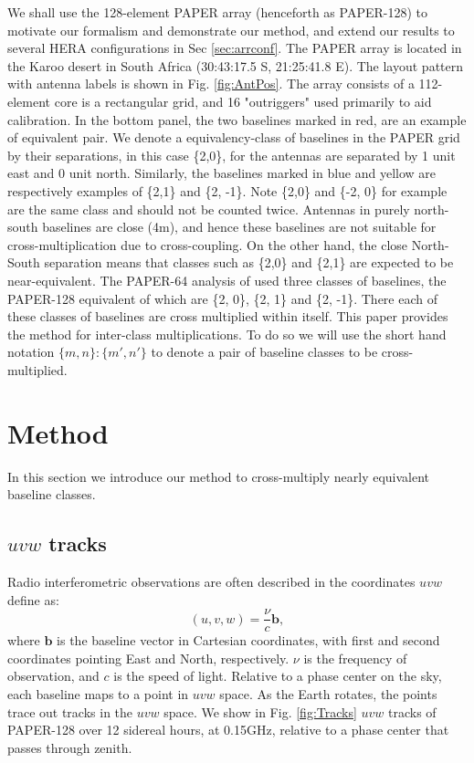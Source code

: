 \documentclass[twocolumn,apj,numberedappendix]{emulateapj}
\renewcommand\[{\begin{equation}}
\renewcommand\]{\end{equation}}
\begin{document}
We shall use the 128-element PAPER array (henceforth as PAPER-128) to motivate our formalism and demonstrate our method, and extend our results to several HERA configurations in Sec \ref{sec:arrconf}. 
The PAPER array is located in the Karoo desert in South Africa (30:43:17.5
S, 21:25:41.8 E). The layout pattern with antenna labels is shown
in Fig. \ref{fig:AntPos}. The array consists of a 112-element core is a rectangular grid, and 16 "outriggers" used primarily to aid calibration.  In the bottom panel, the two baselines marked in red, are an example of equivalent pair. We denote a equivalency-class of baselines in the PAPER grid by their separations, in this case  \{2,0\}, for the
antennas are separated by 1 unit east and 0 unit north. Similarly,
the baselines marked in blue and yellow are respectively examples
of \{2,1\} and \{2, -1\}.
Note \{2,0\} and \{-2, 0\} for example are the same class and should
not be counted twice. Antennas in purely north-south baselines
are close (4m), and hence these baselines are not suitable
for cross-multiplication due to cross-coupling. On the other hand, the close North-South separation means that classes such as \{2,0\} and  \{2,1\} are expected to be near-equivalent. The PAPER-64 analysis of \cite{Ali2015} used three classes of baselines, the PAPER-128
equivalent of which are 
\{2, 0\}, \{2, 1\} and \{2, -1\}. There each of these classes
of baselines are cross multiplied within itself. This paper provides the method for inter-class multiplications. To do so we will use the short hand notation $\{m,n\}:\{m',n'\}$ to denote a pair of baseline classes to be cross-multiplied. 


\section{Method \label{sec:method}}\label{sec:method}

In this section we introduce our method to cross-multiply nearly equivalent baseline classes. 

\subsection{$uvw$ tracks \label{sec:tracks}}


Radio interferometric observations are often described in the coordinates $uvw$ define as:
\[
(u, v, w) = \frac{\nu}{c}\boldsymbol{b}, 
\]
where $\boldsymbol{b}$ is the baseline vector in Cartesian coordinates, with first and second coordinates pointing East and North, respectively.  $\nu$ is the frequency of observation, and $c$ is the speed of light. 
Relative to a phase center on the sky, each baseline maps to a point in $uvw$ space. As the Earth rotates, the points trace out tracks in the $uvw$ space. 
We show in Fig. \ref{fig:Tracks} $uvw$ tracks of PAPER-128 over 12 sidereal hours, at 0.15GHz, relative to a phase center that passes through zenith. 
\end{document}
